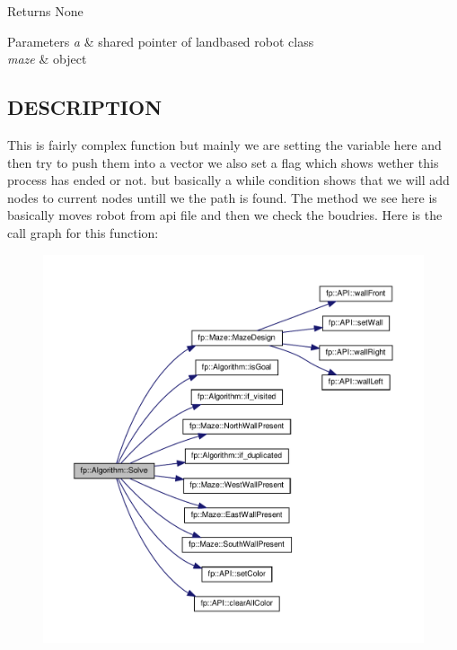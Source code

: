 \begin{DoxyReturn}{Returns}
None 
\end{DoxyReturn}

\begin{DoxyParams}{Parameters}
{\em a} & shared pointer of landbased robot class \\
\hline
{\em maze} & object \\
\hline
\end{DoxyParams}
\hypertarget{_m_a_z_e_8h_DESCRIPTION}{}\subsection{D\+E\+S\+C\+R\+I\+P\+T\+I\+ON}\label{_m_a_z_e_8h_DESCRIPTION}
This is fairly complex function but mainly we are setting the variable here and then try to push them into a vector we also set a flag which shows wether this process has ended or not. but basically a while condition shows that we will add nodes to current nodes untill we the path is found. The method we see here is basically moves robot from api file and then we check the boudries. Here is the call graph for this function\+:
\nopagebreak
\begin{figure}[H]
\begin{center}
\leavevmode
\includegraphics[width=350pt]{classfp_1_1_algorithm_a2e66300e1507ff3f71d5fbbffede52a3_cgraph}
\end{center}
\end{figure}
